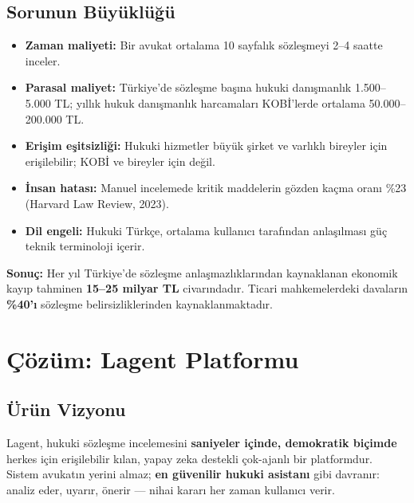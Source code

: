 \documentclass[12pt,a4paper]{article}
\begin{document}
\subsection{Sorunun Büyüklüğü}

\begin{itemize}[leftmargin=*, itemsep=4pt]
  \item \textbf{Zaman maliyeti:} Bir avukat ortalama 10 sayfalık sözleşmeyi 2–4 saatte inceler.
  \item \textbf{Parasal maliyet:} Türkiye'de sözleşme başına hukuki danışmanlık 1.500–5.000 TL;
  yıllık hukuk danışmanlık harcamaları KOBİ'lerde ortalama 50.000–200.000 TL.
  \item \textbf{Erişim eşitsizliği:} Hukuki hizmetler büyük şirket ve varlıklı bireyler için
  erişilebilir; KOBİ ve bireyler için değil.
  \item \textbf{İnsan hatası:} Manuel incelemede kritik maddelerin gözden kaçma oranı \%23
  (Harvard Law Review, 2023).
  \item \textbf{Dil engeli:} Hukuki Türkçe, ortalama kullanıcı tarafından anlaşılması güç teknik
  terminoloji içerir.
\end{itemize}

\begin{highlightbox}
\textbf{\color{danger}Sonuç:} Her yıl Türkiye'de sözleşme anlaşmazlıklarından kaynaklanan
ekonomik kayıp tahminen \textbf{15–25 milyar TL} civarındadır. Ticari mahkemelerdeki davaların
\textbf{\%40'ı} sözleşme belirsizliklerinden kaynaklanmaktadır.
\end{highlightbox}

\section{Çözüm: Lagent Platformu}

\subsection{Ürün Vizyonu}

Lagent, hukuki sözleşme incelemesini \textbf{saniyeler içinde, demokratik biçimde} herkes için
erişilebilir kılan, yapay zeka destekli çok-ajanlı bir platformdur. Sistem avukatın yerini almaz;
\textbf{en güvenilir hukuki asistanı} gibi davranır: analiz eder, uyarır, önerir — nihai kararı
her zaman kullanıcı verir.
\end{document}
